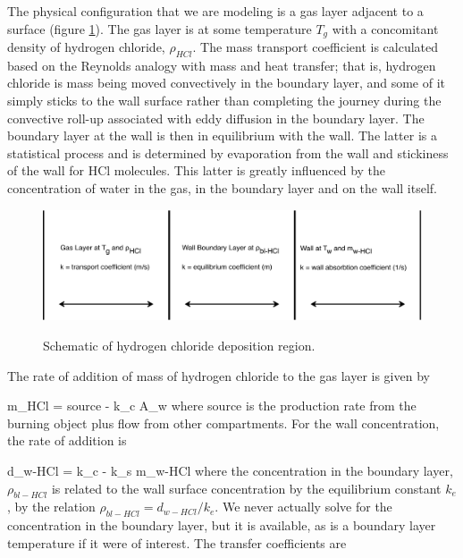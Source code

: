 The physical configuration that we are modeling is a gas layer adjacent to a surface (figure \ref{fig:HCl_Deposition}).  The gas layer is at some temperature $T_g$ with a concomitant density of hydrogen chloride, $\rho_{HCl}$.  The mass transport coefficient is calculated based on the Reynolds analogy with mass and heat transfer; that is, hydrogen chloride is mass being moved convectively in the boundary layer, and some of it simply sticks to the wall surface rather than completing the journey during the convective roll-up associated with eddy diffusion in the boundary layer.  The boundary layer at the wall is then in equilibrium with the wall.  The latter is a statistical process and is determined by evaporation from the wall and stickiness of the wall for HCl molecules.  This latter is greatly influenced by the concentration of water in the gas, in the boundary layer and on the wall itself.

\begin{figure}[h]
\begin{center}
\includegraphics[width=5.0in]{FIGURES/Theory/HCl_Deposition}\\
\end{center}
\caption{Schematic of hydrogen chloride deposition region.}
 \label{fig:HCl_Deposition}
\end{figure}

The rate of addition of mass of hydrogen chloride to the gas layer is given by

\be {} m_{HCl} = source - k_c  A_w \ee
where source is the production rate from the burning object plus flow from other compartments. For the wall concentration, the rate of addition is

\be {} d_{w-HCl} = k_c  - k_s m_{w-HCl} \ee
where the concentration in the boundary layer, $\rho_{bl-HCl}$  is related to the wall surface concentration by the equilibrium constant $k_e$, by the relation $\rho_{bl-HCl} = d_{w-HCl} / k_e$. We never actually solve for the concentration in the boundary layer, but it is available, as is a boundary layer temperature if it were of interest.  The transfer coefficients are

